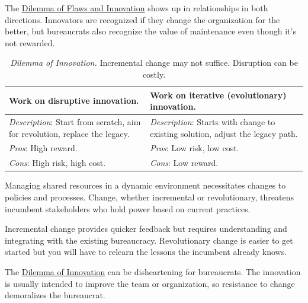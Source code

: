 The \href{table:flaws-and-innovation}{Dilemma of Flaws and Innovation} shows up in relationships in both directions. Innovators are recognized if they change the organization for the better, but bureaucrats also recognize the value of maintenance even though it's not rewarded. 


\begin{center}
\begin{table}[H] %
\begin{tabular}{ | m{\dilemmatablewidth}| m{\dilemmatablewidth} | } 
  \hline
  \textbf{Work on disruptive innovation.} &
  \textbf{Work on iterative (evolutionary) innovation.} \\
  \hline
  \textit{Description}: Start from scratch, aim for revolution, replace the legacy.  &
  \textit{Description}: Starts with change to existing solution, adjust the legacy path.  \\  
  \hline
  \textit{Pros}: High reward. & 
  \textit{Pros}: Low risk, low cost. \\
  \hline
  \textit{Cons}: High risk, high cost. & 
  \textit{Cons}: Low reward. \\
  \hline
\end{tabular}
\caption{\textit{Dilemma of Innovation.}
Incremental change may not suffice. Disruption can be costly.
}
\label{table:disruptive-or-iterative}
\end{table}
\end{center}

Managing shared resources in a dynamic environment necessitates changes to policies and processes. Change, whether incremental or revolutionary, threatens incumbent stakeholders who hold power based on current practices. 

Incremental change provides quicker feedback but requires understanding and integrating with the existing bureaucracy. Revolutionary change is easier to get started but you will have to relearn the lessons the incumbent already knows.

The \href{table:disruptive-or-iterative}{Dilemma of Innovation} can be disheartening for bureaucrats. The innovation is usually intended to improve the team or organization, so resistance to change demoralizes the bureaucrat. 

